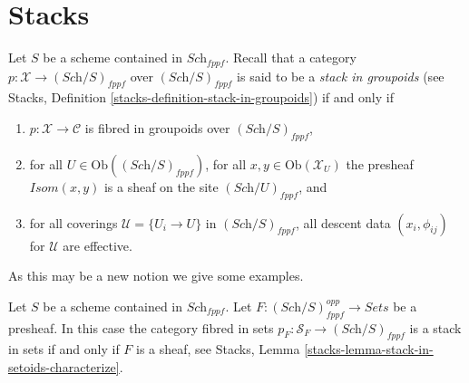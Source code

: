 \section{Stacks}
\label{section-stacks}

\noindent
Let $S$ be a scheme contained in $\textit{Sch}_{fppf}$.
Recall that a category $p : \mathcal{X} \to (\textit{Sch}/S)_{fppf}$
over $(\textit{Sch}/S)_{fppf}$ is said to be a
{\it stack in groupoids} (see
Stacks, Definition \ref{stacks-definition-stack-in-groupoids})
if and only if
\begin{enumerate}
\item $p : \mathcal{X} \to \mathcal{C}$ is fibred
in groupoids over $(\textit{Sch}/S)_{fppf}$,
\item for all $U \in \text{Ob}((\textit{Sch}/S)_{fppf})$,
for all $x, y\in \text{Ob}(\mathcal{X}_U)$ the presheaf
$\mathit{Isom}(x, y)$ is a sheaf on the site $(\textit{Sch}/U)_{fppf}$, and
\item for all coverings $\mathcal{U} = \{U_i \to U\}$ in
$(\textit{Sch}/S)_{fppf}$, all descent data $(x_i, \phi_{ij})$
for $\mathcal{U}$ are effective.
\end{enumerate}
As this may be a new notion we give some examples.

\begin{example}
\label{example-stack-associated-to-sheaf}
Let $S$ be a scheme contained in $\textit{Sch}_{fppf}$.
Let $F : (\textit{Sch}/S)_{fppf}^{opp} \to \textit{Sets}$ be a presheaf.
In this case the category fibred in sets
$p_F : \mathcal{S}_F \to (\textit{Sch}/S)_{fppf}$
is a stack in sets if and only if $F$ is a sheaf, see
Stacks, Lemma \ref{stacks-lemma-stack-in-setoids-characterize}.
\end{example}

